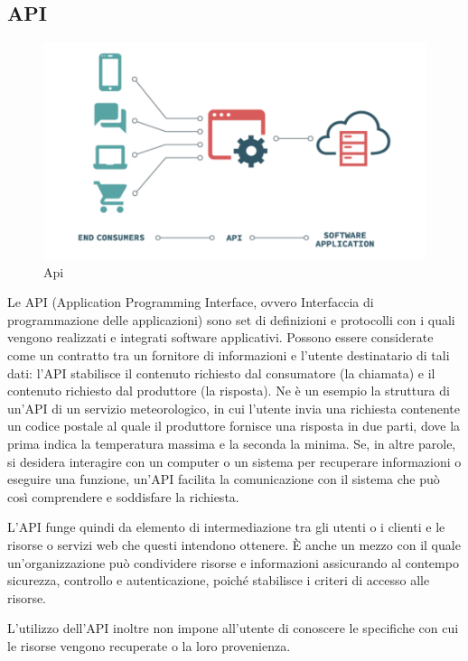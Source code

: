 \documentclass[12pt,a4paper]{article}
\begin{document}
\subsection{API}
\begin{figure}[H]
    \centering
    \includegraphics[width=.9\linewidth]{api.png}
    \caption{Api}
\end{figure}

Le API (Application Programming Interface, ovvero Interfaccia di programmazione delle applicazioni) sono set di definizioni e protocolli con i quali vengono realizzati e integrati software applicativi. Possono essere considerate come un contratto tra un fornitore di informazioni e l'utente destinatario di tali dati: l'API stabilisce il contenuto richiesto dal consumatore (la chiamata) e il contenuto richiesto dal produttore (la risposta). Ne è un esempio la struttura di un'API di un servizio meteorologico, in cui l'utente invia una richiesta contenente un codice postale al quale il produttore fornisce una risposta in due parti, dove la prima indica la temperatura massima e la seconda la minima.
\hfill \break \break
Se, in altre parole, si desidera interagire con un computer o un sistema per recuperare informazioni o eseguire una funzione, un'API facilita la comunicazione con il sistema che può così comprendere e soddisfare la richiesta.

L'API funge quindi da elemento di intermediazione tra gli utenti o i clienti e le risorse o servizi web che questi intendono ottenere. È anche un mezzo con il quale un'organizzazione può condividere risorse e informazioni assicurando al contempo sicurezza, controllo e autenticazione, poiché stabilisce i criteri di accesso alle risorse.

L'utilizzo dell'API inoltre non impone all'utente di conoscere le specifiche con cui le risorse vengono recuperate o la loro provenienza.
\end{document}
